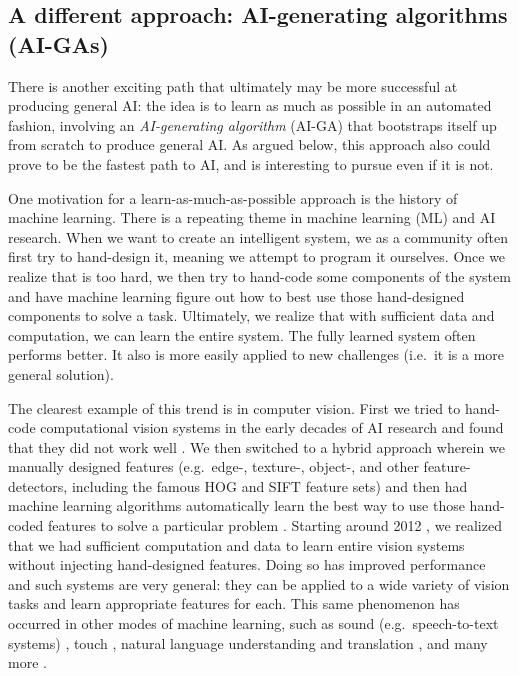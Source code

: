 \documentclass{article}
\begin{document}
\subsection{A different approach: AI-generating algorithms (AI-GAs)}
\label{AIGAs-aDifferentApproach}

There is another exciting path that ultimately may be more successful at producing general AI: the idea is to learn as much as possible in an automated fashion, involving an \emph{AI-generating algorithm} (AI-GA) that bootstraps itself up from scratch to produce general AI. As argued below, this approach also could prove to be the fastest path to AI, and is interesting to pursue even if it is not. 

One motivation for a learn-as-much-as-possible approach is the history of machine learning. There is a repeating theme in machine learning (ML) and AI research. When we want to create an intelligent system, we as a community often first try to hand-design it, meaning we attempt to program it ourselves. Once we realize that is too hard, we then try to hand-code some components of the system and have machine learning figure out how to best use those hand-designed components to solve a task. Ultimately, we realize that with sufficient data and computation, we can learn the entire system. The fully learned system often performs better. It also is more easily applied to new challenges (i.e.\ it is a more general solution). 

The clearest example of this trend is in computer vision. First we tried to hand-code computational vision systems in the early decades of AI research and found that they did not work well \cite{Szeliski2010ComputerVisionTextbook}. We then switched to a hybrid approach wherein we manually designed features (e.g.\ edge-, texture-, object-, and other feature-detectors, including the famous HOG \cite{dalal2005histograms} and SIFT \cite{lowe1999object} feature sets) and then had machine learning algorithms automatically learn the best way to use those hand-coded features to solve a particular problem \cite{Szeliski2010ComputerVisionTextbook}. Starting around 2012 \cite{krizhevsky2012imagenet}, we realized that we had sufficient computation and data to learn entire vision systems without injecting hand-designed features. Doing so has improved performance and such systems are very general: they can be applied to a wide variety of vision tasks and learn appropriate features for each. This same phenomenon has occurred in other modes of machine learning, such as sound (e.g.\ speech-to-text systems) \cite{hinton2012deep}, touch \cite{gao2016deep}, natural language understanding and translation \cite{devlin2018bert,bahdanau2014neural,sutskever2014sequence}, and many more \cite{Goodfellow-et-al-2016}. 
\end{document}
